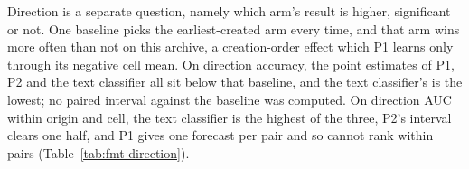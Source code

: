 Direction is a separate question, namely which arm's result is higher, significant or not. One baseline picks the earliest-created arm every time, and that arm wins more often than not on this archive, a creation-order effect which P1 learns only through its negative cell mean. On direction accuracy, the point estimates of P1, P2 and the text classifier all sit below that baseline, and the text classifier's is the lowest; no paired interval against the baseline was computed. On direction AUC within origin and cell, the text classifier is the highest of the three, P2's interval clears one half, and P1 gives one forecast per pair and so cannot rank within pairs (Table~\ref{tab:fmt-direction}).

\begin{table}[t]\centering\scriptsize
\caption{Direction of the winner on the headline archive, pooled. The columns report direction accuracy over all rows, measured against a ceiling of 0.817; direction accuracy on the 2,696 decisive rows; and the direction AUC within origin and cell. A baseline that gives a single forecast has no AUC.}
\label{tab:fmt-direction}

\end{table}

